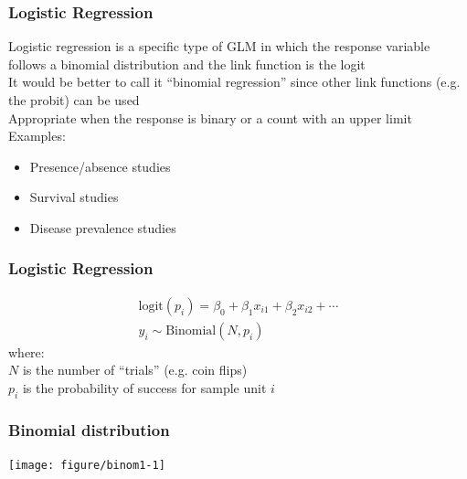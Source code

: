 \documentclass[color=usenames,dvipsnames]{beamer}\usepackage[]{graphicx}\usepackage[]{color}
\newenvironment{knitrout}{}{} %
\begin{document}
\begin{frame}
  \frametitle{Logistic Regression}
  Logistic regression is a specific type of GLM in which the
      response variable follows a binomial distribution and the link
      function is the logit \\
  \pause
  \vfill
  It would be better to call it ``binomial regression'' since other
      link functions (e.g. the probit) can be used \\
  \pause
  \vfill
  Appropriate when the response is binary or a count with an
  upper limit
  \pause
  \vfill
  {Examples:}
      \begin{itemize}
        \normalsize
        \item Presence/absence studies
        \item Survival studies
        \item Disease prevalence studies
      \end{itemize}
\end{frame}







\begin{frame}
  \frametitle{Logistic Regression}
    \begin{gather*}
      \mathrm{logit}(p_i) = \beta_0 + \beta_1 x_{i1} + \beta_2 x_{i2} + \cdots \\
      y_i \sim \mathrm{Binomial}(N, p_i)
  \end{gather*}
  \pause
  {where: \\}
  $N$ is the number of ``trials'' (e.g. coin flips) \\
  $p_i$ is the probability of success for sample unit $i$
\end{frame}



\begin{frame}[fragile]
  \frametitle{Binomial distribution}%
  \vspace{-0.4cm}
\begin{center}
\begin{knitrout}
\color{fgcolor}
\texttt{[image: figure/binom1-1]} 
\end{knitrout}
\end{center}
\vfill
\end{frame}
\end{document}
